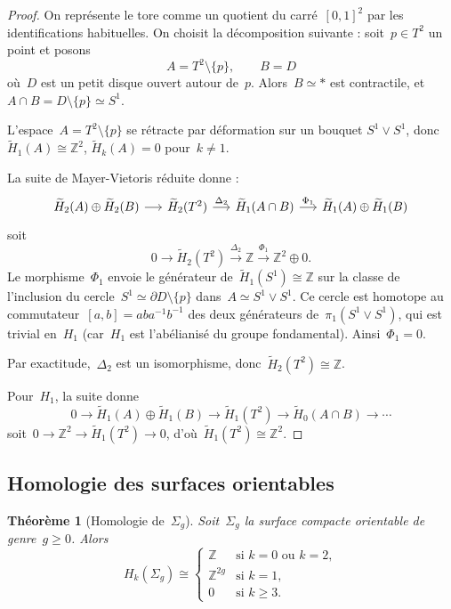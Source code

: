 \documentclass[12pt,a4paper,openany]{book}
\theoremstyle{definition}
\theoremstyle{plain}
\newtheorem{theoreme}[definition]{Théorème}
\theoremstyle{remark}
\newcommand{\Z}{\mathbb{Z}}
\begin{document}
\begin{proof}
On représente le tore comme un quotient du carré~$[0,1]^2$ par les identifications
habituelles. On choisit la décomposition suivante : soit~$p \in T^2$ un point et posons
\[
  A = T^2 \setminus \{p\}, \qquad B = D
\]
où~$D$ est un petit disque ouvert autour de~$p$. Alors~$B \simeq \ast$ est contractile,
et~$A \cap B = D \setminus \{p\} \simeq S^1$.

L'espace~$A = T^2 \setminus \{p\}$ se rétracte par déformation sur un bouquet
$S^1 \vee S^1$, donc~$\widetilde{H}_1(A) \cong \Z^2$,
$\widetilde{H}_k(A) = 0$ pour~$k \neq 1$.

La suite de Mayer-Vietoris réduite donne :
\[
\begin{tikzcd}[column sep=1.4em]
  \widetilde{H}_2(A) \oplus \widetilde{H}_2(B) \ar[r]
  & \widetilde{H}_2(T^2) \ar[r, "\Delta_2"]
  & \widetilde{H}_1(A \cap B) \ar[r, "\Phi_1"]
  & \widetilde{H}_1(A) \oplus \widetilde{H}_1(B)
\end{tikzcd}
\]
soit
\[
  0 \longrightarrow \widetilde{H}_2(T^2) \xrightarrow{\Delta_2} \Z
  \xrightarrow{\Phi_1} \Z^2 \oplus 0.
\]
Le morphisme~$\Phi_1$ envoie le générateur de~$\widetilde{H}_1(S^1) \cong \Z$ sur la
classe de l'inclusion du cercle~$S^1 \simeq \partial D \setminus \{p\}$ dans~$A \simeq
S^1 \vee S^1$. Ce cercle est homotope au commutateur~$[a, b] = aba^{-1}b^{-1}$ des
deux générateurs de~$\pi_1(S^1 \vee S^1)$, qui est trivial en~$H_1$ (car~$H_1$ est
l'abélianisé du groupe fondamental). Ainsi~$\Phi_1 = 0$.

Par exactitude,~$\Delta_2$ est un isomorphisme, donc~$\widetilde{H}_2(T^2) \cong \Z$.

Pour~$H_1$, la suite donne
\[
  0 \to \widetilde{H}_1(A) \oplus \widetilde{H}_1(B) \to \widetilde{H}_1(T^2) \to
  \widetilde{H}_0(A \cap B) \to \cdots
\]
soit~$0 \to \Z^2 \to \widetilde{H}_1(T^2) \to 0$,
d'où~$\widetilde{H}_1(T^2) \cong \Z^2$.
\end{proof}

\subsection{Homologie des surfaces orientables}\label{subsec:homologie-surfaces}

\begin{theoreme}[Homologie de~$\Sigma_g$]\label{thm:homologie-sigma-g}
Soit~$\Sigma_g$ la surface compacte orientable de genre~$g \geqslant 0$.
Alors
\[
  H_k(\Sigma_g) \cong
  \begin{cases}
    \Z      & \text{si } k = 0 \text{ ou } k = 2,\\
    \Z^{2g} & \text{si } k = 1,\\
    0       & \text{si } k \geqslant 3.
  \end{cases}
\]
\end{theoreme}
\end{document}
